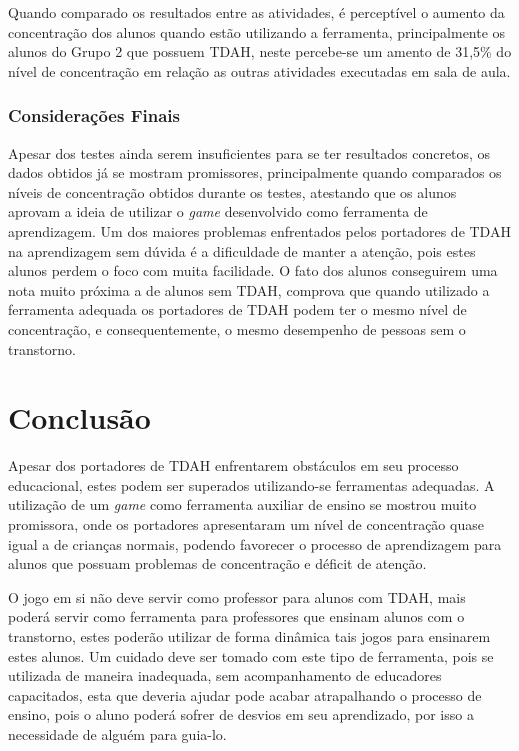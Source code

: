 \documentclass[
	12pt,				%
    oneside,			%
	a4paper,			%
	english,			%
	french,				%
	spanish,			%
	brazil,				%
	]{abntex2}
\begin{document}
		Quando comparado os resultados entre as atividades, é perceptível o aumento da concentração dos alunos quando estão utilizando a ferramenta, principalmente os alunos do Grupo 2 que possuem TDAH, neste percebe-se um amento de 31,5\% do nível de concentração em relação as outras atividades executadas em sala de aula.
		
		\subsection{Considerações Finais}
		
		Apesar dos testes ainda serem insuficientes para se ter resultados concretos, os dados obtidos já se mostram promissores, principalmente quando comparados os níveis de concentração obtidos durante os testes, atestando que os alunos aprovam a ideia de utilizar o \textit{game} desenvolvido como ferramenta de aprendizagem. Um dos maiores problemas enfrentados pelos portadores de TDAH na aprendizagem sem dúvida é a dificuldade de manter a atenção, pois estes alunos perdem o foco com muita facilidade. O fato dos alunos conseguirem uma nota muito próxima a de alunos sem TDAH, comprova que quando utilizado a ferramenta adequada os portadores de TDAH podem ter o mesmo nível de concentração, e consequentemente, o mesmo desempenho de pessoas sem o transtorno.
		
	

\chapter{Conclusão}

	Apesar dos portadores de TDAH enfrentarem obstáculos em seu processo educacional, estes podem ser superados utilizando-se ferramentas adequadas. A utilização de um \textit{game} como ferramenta auxiliar de ensino se mostrou muito promissora, onde os portadores apresentaram um nível de concentração quase igual a de crianças normais, podendo favorecer o processo de aprendizagem para alunos que possuam problemas de concentração e déficit de atenção.
	
	O jogo em si não deve servir como professor para alunos com TDAH, mais poderá servir como ferramenta para professores que ensinam alunos com o transtorno, estes poderão utilizar de forma dinâmica tais jogos para ensinarem estes alunos. Um cuidado deve ser tomado com este tipo de ferramenta, pois se utilizada de maneira inadequada, sem acompanhamento de educadores capacitados, esta que deveria ajudar pode acabar atrapalhando o processo de ensino, pois o aluno poderá sofrer de desvios em seu aprendizado, por isso a necessidade de alguém para guia-lo.	
	
\end{document}
